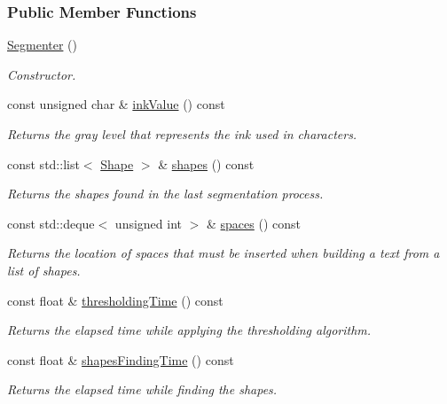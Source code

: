 \subsubsection*{Public Member Functions}
\begin{CompactItemize}
\item 
\hyperlink{class_segmenter_d39ec3bda31be180820aa0bdca7b125d}{Segmenter} ()
\begin{CompactList}\small\item\em Constructor. \item\end{CompactList}\item 
const unsigned char \& \hyperlink{class_segmenter_e9bc56ddcbe5ea4abb40fcc85e3d9fbe}{inkValue} () const 
\begin{CompactList}\small\item\em Returns the gray level that represents the ink used in characters. \item\end{CompactList}\item 
const std::list$<$ \hyperlink{class_shape}{Shape} $>$ \& \hyperlink{class_segmenter_7ddded12f26e94e6f5cba2752d2c4142}{shapes} () const 
\begin{CompactList}\small\item\em Returns the shapes found in the last segmentation process. \item\end{CompactList}\item 
const std::deque$<$ unsigned int $>$ \& \hyperlink{class_segmenter_eed49de2d6548ae8016bf6c9c78cec99}{spaces} () const 
\begin{CompactList}\small\item\em Returns the location of spaces that must be inserted when building a text from a list of shapes. \item\end{CompactList}\item 
const float \& \hyperlink{class_segmenter_9114d0f3934b43478fb55077b7722d3d}{thresholdingTime} () const 
\begin{CompactList}\small\item\em Returns the elapsed time while applying the thresholding algorithm. \item\end{CompactList}\item 
const float \& \hyperlink{class_segmenter_8d7304b35b1891b1c7154a3ac2ff2c4b}{shapesFindingTime} () const 
\begin{CompactList}\small\item\em Returns the elapsed time while finding the shapes. \item\end{CompactList}\item 

\end{CompactItemize}
